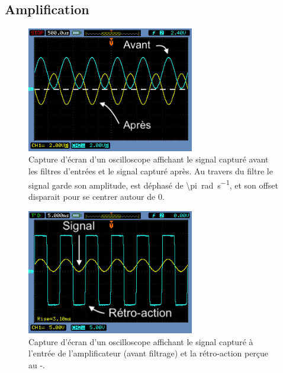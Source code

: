 \documentclass[10pt, oneside, a4paper]{article}
\begin{document}
\subsection{Amplification}

\begin{figure}[htbp]
	\centering
	\includegraphics[width=0.65\textwidth]{image/osci-post-filters.png}
	\caption{Capture d'écran d'un oscilloscope affichant le signal capturé avant les
			 filtres d'entrées et le signal capturé après.
			 Au travers du filtre le signal garde son amplitude, est déphasé de
			 \SI{\pi}{\radian\per\second}, et son offset disparait pour se centrer autour
			 de 0.}
	\label{fig:osci-speaker}
\end{figure}

\begin{figure}[htbp]
	\centering
	\includegraphics[width=0.65\textwidth]{image/osci-compar.png}
	\caption{Capture d'écran d'un oscilloscope affichant le signal capturé à l'entrée
			 de l'amplificateur (avant filtrage) et la rétro-action perçue au
			 \Sigma{}-\Delta{}.}
	\label{fig:osci-compar}
\end{figure}
\end{document}

